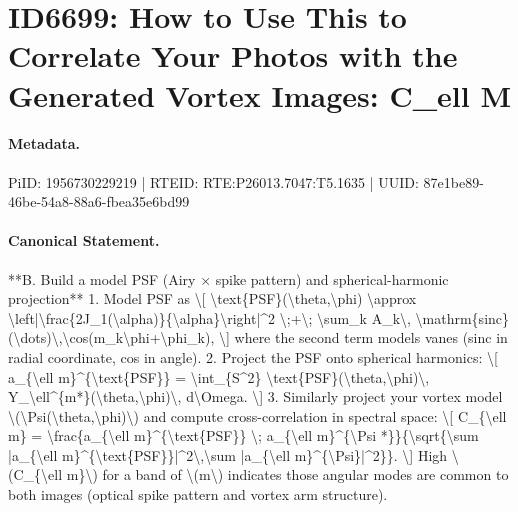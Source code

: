 \section*{ID6699: How to Use This to Correlate Your Photos with the Generated Vortex Images: C\_ell M}
\paragraph{Metadata.}
PiID: 1956730229219 | RTEID: RTE:P26013.7047:T5.1635 | UUID: 87e1be89-46be-54a8-88a6-fbea35e6bd99

\paragraph{Canonical Statement.}
**B. Build a model PSF (Airy × spike pattern) and spherical-harmonic projection** 1. Model PSF as \textbackslash{}[ \textbackslash{}text\{PSF\}(\textbackslash{}theta,\textbackslash{}phi) \textbackslash{}approx \textbackslash{}left|\textbackslash{}frac\{2J\_1(\textbackslash{}alpha)\}\{\textbackslash{}alpha\}\textbackslash{}right|\textasciicircum{}2 \textbackslash{};+\textbackslash{}; \textbackslash{}sum\_k A\_k\textbackslash{}, \textbackslash{}mathrm\{sinc\}(\textbackslash{}dots)\textbackslash{},\textbackslash{}cos(m\_k\textbackslash{}phi+\textbackslash{}phi\_k), \textbackslash{}] where the second term models vanes (sinc in radial coordinate, cos in angle). 2. Project the PSF onto spherical harmonics: \textbackslash{}[ a\_\{\textbackslash{}ell m\}\textasciicircum{}\{\textbackslash{}text\{PSF\}\} = \textbackslash{}int\_\{S\textasciicircum{}2\} \textbackslash{}text\{PSF\}(\textbackslash{}theta,\textbackslash{}phi)\textbackslash{}, Y\_\textbackslash{}ell\textasciicircum{}\{m*\}(\textbackslash{}theta,\textbackslash{}phi)\textbackslash{}, d\textbackslash{}Omega. \textbackslash{}] 3. Similarly project your vortex model \textbackslash{}(\textbackslash{}Psi(\textbackslash{}theta,\textbackslash{}phi)\textbackslash{}) and compute cross-correlation in spectral space: \textbackslash{}[ C\_\{\textbackslash{}ell m\} = \textbackslash{}frac\{a\_\{\textbackslash{}ell m\}\textasciicircum{}\{\textbackslash{}text\{PSF\}\} \textbackslash{}; a\_\{\textbackslash{}ell m\}\textasciicircum{}\{\textbackslash{}Psi *\}\}\{\textbackslash{}sqrt\{\textbackslash{}sum |a\_\{\textbackslash{}ell m\}\textasciicircum{}\{\textbackslash{}text\{PSF\}\}|\textasciicircum{}2\textbackslash{},\textbackslash{}sum |a\_\{\textbackslash{}ell m\}\textasciicircum{}\{\textbackslash{}Psi\}|\textasciicircum{}2\}\}. \textbackslash{}] High \textbackslash{}(C\_\{\textbackslash{}ell m\}\textbackslash{}) for a band of \textbackslash{}(m\textbackslash{}) indicates those angular modes are common to both images (optical spike pattern and vortex arm structure).

